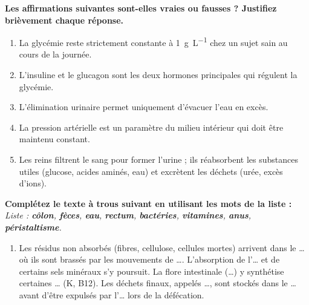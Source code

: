 \documentclass[11pt]{article}
\begin{document}
\begin{exercice}
\textbf{Les affirmations suivantes sont-elles vraies ou fausses ? Justifiez brièvement chaque réponse.}
\begin{enumerate}
    \item La glycémie reste strictement constante à \SI{1}{g.L^{-1}} chez un sujet sain au cours de la journée.
    \item L'insuline et le glucagon sont les deux hormones principales qui régulent la glycémie.
    \item L'élimination urinaire permet uniquement d'évacuer l'eau en excès.
    \item La pression artérielle est un paramètre du milieu intérieur qui doit être maintenu constant.
    \item Les reins filtrent le sang pour former l'urine ; ils réabsorbent les substances utiles (glucose, acides aminés, eau) et excrètent les déchets (urée, excès d'ions).
\end{enumerate}
\end{exercice}

\begin{exercice}
\textbf{Complétez le texte à trous suivant en utilisant les mots de la liste :}
\medskip
\noindent \textit{Liste : \textbf{côlon}, \textbf{fèces}, \textbf{eau}, \textbf{rectum}, \textbf{bactéries}, \textbf{vitamines}, \textbf{anus}, \textbf{péristaltisme}.}
\medskip
\begin{enumerate}
    \item Les résidus non absorbés (fibres, cellulose, cellules mortes) arrivent dans le \ldots{} où ils sont brassés par les mouvements de \ldots{}. L'absorption de l'\ldots{} et de certains sels minéraux s'y poursuit. La flore intestinale (\ldots{}) y synthétise certaines \ldots{} (K, B12). Les déchets finaux, appelés \ldots{}, sont stockés dans le \ldots{} avant d'être expulsés par l'\ldots{} lors de la défécation.
\end{enumerate}
\end{exercice}
\end{document}
